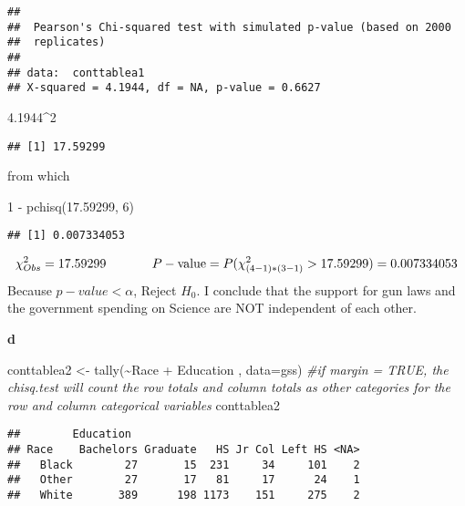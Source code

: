 \documentclass[
]{article}
\newenvironment{Shaded}{\begin{snugshade}}{\end{snugshade}}
\newcommand{\AttributeTok}[1]{\textcolor[rgb]{0.77,0.63,0.00}{#1}}
\newcommand{\CommentTok}[1]{\textcolor[rgb]{0.56,0.35,0.01}{\textit{#1}}}
\newcommand{\DecValTok}[1]{\textcolor[rgb]{0.00,0.00,0.81}{#1}}
\newcommand{\FloatTok}[1]{\textcolor[rgb]{0.00,0.00,0.81}{#1}}
\newcommand{\FunctionTok}[1]{\textcolor[rgb]{0.00,0.00,0.00}{#1}}
\newcommand{\NormalTok}[1]{#1}
\newcommand{\OtherTok}[1]{\textcolor[rgb]{0.56,0.35,0.01}{#1}}
\newcommand{\SpecialCharTok}[1]{\textcolor[rgb]{0.00,0.00,0.00}{#1}}
\begin{document}
\begin{verbatim}
## 
##  Pearson's Chi-squared test with simulated p-value (based on 2000
##  replicates)
## 
## data:  conttablea1
## X-squared = 4.1944, df = NA, p-value = 0.6627
\end{verbatim}

\begin{Shaded}
\begin{Highlighting}[]
\FloatTok{4.1944}\SpecialCharTok{\^{}}\DecValTok{2}
\end{Highlighting}
\end{Shaded}

\begin{verbatim}
## [1] 17.59299
\end{verbatim}

from which

\begin{Shaded}
\begin{Highlighting}[]
\DecValTok{1} \SpecialCharTok{{-}} \FunctionTok{pchisq}\NormalTok{(}\FloatTok{17.59299}\NormalTok{, }\DecValTok{6}\NormalTok{)}
\end{Highlighting}
\end{Shaded}

\begin{verbatim}
## [1] 0.007334053
\end{verbatim}

\[
\chi^{2}_{Obs} = 17.59299 \hspace{0.5in} P-\text{value} = P(\chi^{2}_{(4-1)*(3-1)} > 17.59299) = 0.007334053
\] Because \(p-value < \alpha\), Reject \(H_{0}\). I conclude that the
support for gun laws and the government spending on Science are NOT
independent of each other.

\textbf{d}

\begin{Shaded}
\begin{Highlighting}[]
\NormalTok{conttablea2 }\OtherTok{\textless{}{-}} \FunctionTok{tally}\NormalTok{(}\SpecialCharTok{\textasciitilde{}}\NormalTok{Race }\SpecialCharTok{+}\NormalTok{ Education , }\AttributeTok{data=}\NormalTok{gss) }\CommentTok{\#if margin = TRUE, the chisq.test will count the row totals and column totals as other \textquotesingle{}categories\textquotesingle{} for the row and column categorical variables}
\NormalTok{conttablea2}
\end{Highlighting}
\end{Shaded}

\begin{verbatim}
##        Education
## Race    Bachelors Graduate   HS Jr Col Left HS <NA>
##   Black        27       15  231     34     101    2
##   Other        27       17   81     17      24    1
##   White       389      198 1173    151     275    2
\end{verbatim}
\end{document}
